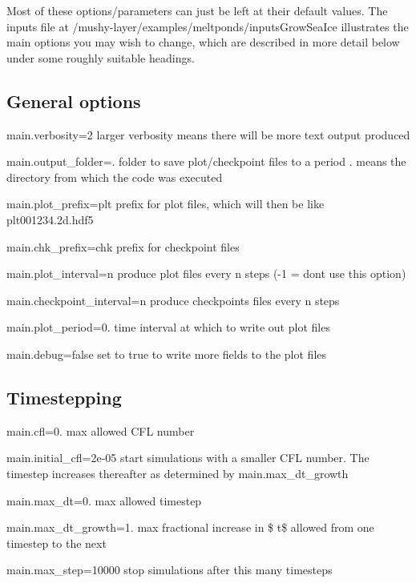 Most of these options/parameters can just be left at their default values. The inputs file at {\ttfamily /mushy-\/layer/examples/meltponds/inputs\+Grow\+Sea\+Ice} illustrates the main options you may wish to change, which are described in more detail below under some roughly suitable headings.

\subsection*{General options}

{\ttfamily main.\+verbosity=2} larger verbosity means there will be more text output produced

{\ttfamily main.\+output\+\_\+folder=.} folder to save plot/checkpoint files to a period {\ttfamily .} means the directory from which the code was executed

{\ttfamily main.\+plot\+\_\+prefix=plt} prefix for plot files, which will then be like {\ttfamily plt001234.\+2d.\+hdf5}

{\ttfamily main.\+chk\+\_\+prefix=chk} prefix for checkpoint files

{\ttfamily main.\+plot\+\_\+interval=n} produce plot files every {\ttfamily n} steps (-\/1 = don\textquotesingle{}t use this option)

{\ttfamily main.\+checkpoint\+\_\+interval=n} produce checkpoints files every {\ttfamily n} steps

{\ttfamily main.\+plot\+\_\+period=0.} time interval at which to write out plot files

{\ttfamily main.\+debug=false} set to true to write more fields to the plot files

\subsection*{Timestepping}

{\ttfamily main.\+cfl=0.} max allowed C\+FL number

{\ttfamily main.\+initial\+\_\+cfl=2e-\/05} start simulations with a smaller C\+FL number. The timestep increases thereafter as determined by {\ttfamily main.\+max\+\_\+dt\+\_\+growth}

{\ttfamily main.\+max\+\_\+dt=0.} max allowed timestep

{\ttfamily main.\+max\+\_\+dt\+\_\+growth=1.} max fractional increase in \$ t\$ allowed from one timestep to the next

{\ttfamily main.\+max\+\_\+step=10000} stop simulations after this many timesteps

